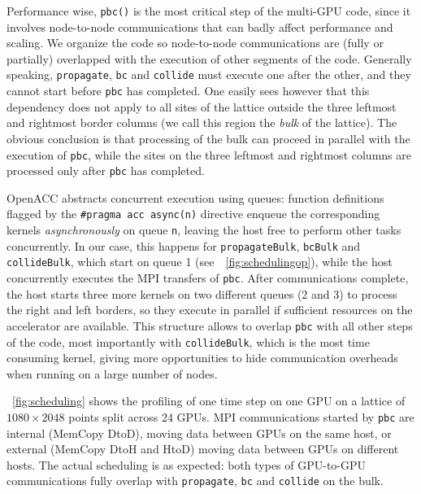 \documentclass[times]{cpeauth}
\begin{document}
Performance wise, {\tt pbc()} is the most critical step of the multi-GPU 
code, since it involves node-to-node communications that can badly affect 
performance and scaling.
%
We organize the code so 
node-to-node communications are (fully or partially) overlapped  
with the execution of other segments of the code. 
%
Generally speaking, {\tt propagate}, {\tt bc} and  {\tt collide} must execute
one after the other, and they cannot start  before {\tt pbc} has completed. 
%
One easily sees however that this dependency does not apply to all sites of the
lattice outside the three leftmost and rightmost border columns
(we call this region the {\em bulk} of the lattice). 
%
The obvious conclusion is that processing of the bulk can proceed in parallel 
with the execution of {\tt pbc}, while the sites on the three leftmost and 
rightmost columns are processed only after {\tt pbc} has completed.

OpenACC abstracts concurrent execution using queues: function 
definitions flagged by the {\tt \#pragma acc async(n)} directive enqueue 
the corresponding kernels {\em asynchronously} on queue {\tt n}, 
leaving the host free to perform other tasks concurrently.
In our case, this happens for {\tt propagateBulk}, 
{\tt bcBulk} and {\tt collideBulk}, which start on queue 1 (see~\figurename~\ref{fig:schedulingop}), 
while the host concurrently executes the MPI transfers of {\tt pbc}.
After communications complete, the host starts three more kernels 
on two different queues (2 and 3) to process the right and left borders, 
so they execute in parallel if sufficient resources on the accelerator are available.
%
This structure allows to overlap {\tt pbc} with  
all other steps of the code, most importantly with {\tt collideBulk}, which is
the most time consuming kernel, giving more opportunities to hide 
communication overheads when running on a large number of nodes.

\figurename~\ref{fig:scheduling} shows the profiling of one time step  
on one GPU on a lattice of $1080 \times 2048$ points split across 24 GPUs.
%
MPI communications started by {\tt pbc} are internal (MemCopy DtoD),
moving data between GPUs on the same host, or external (MemCopy DtoH and HtoD) 
moving data between GPUs on different hosts.
%
The actual scheduling is as expected: both types of GPU-to-GPU communications 
fully overlap with {\tt propagate}, {\tt bc} and {\tt collide} on the bulk.
\end{document}
